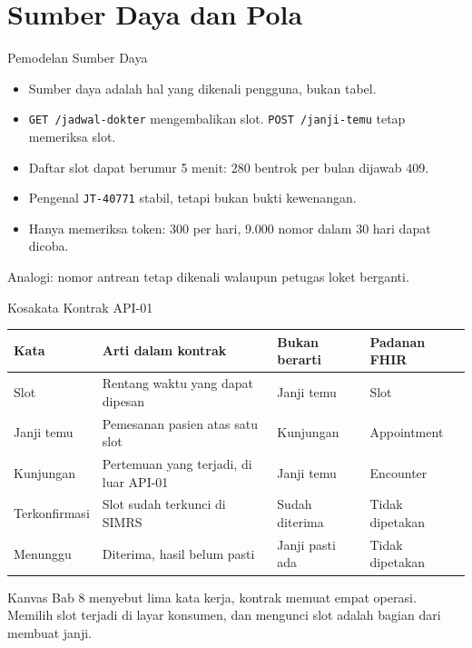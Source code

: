 \documentclass[aspectratio=169, table, 12pt]{beamer}
\begin{document}
\section{Sumber Daya dan Pola}

\begin{frame}{{\Large Pemodelan Sumber Daya}}
  \vspace{8pt}
  \begin{itemize}
    \item Sumber daya adalah hal yang dikenali pengguna, bukan tabel.
    \item \texttt{GET /jadwal-dokter} mengembalikan slot. \texttt{POST /janji-temu} tetap memeriksa slot.
    \item Daftar slot dapat berumur 5 menit: 280 bentrok per bulan dijawab 409.
    \item Pengenal \texttt{JT-40771} stabil, tetapi bukan bukti kewenangan.
    \item Hanya memeriksa token: 300 per hari, 9.000 nomor dalam 30 hari dapat dicoba.
  \end{itemize}
  \vspace{6pt}
  {\small Analogi: nomor antrean tetap dikenali walaupun petugas loket berganti.}
\end{frame}

\begin{frame}{{\Large Kosakata Kontrak API-01}}
  \footnotesize
  \begin{tabularx}{\textwidth}{>{\raggedright\arraybackslash}p{2.4cm} >{\raggedright\arraybackslash}X >{\raggedright\arraybackslash}p{3.1cm} >{\raggedright\arraybackslash}p{2.1cm}}
    \hline
    \textbf{Kata} & \textbf{Arti dalam kontrak} & \textbf{Bukan berarti} & \textbf{Padanan FHIR} \\ \hline
    Slot & Rentang waktu yang dapat dipesan & Janji temu & Slot \\ \hline
    Janji temu & Pemesanan pasien atas satu slot & Kunjungan & Appointment \\ \hline
    Kunjungan & Pertemuan yang terjadi, di luar API-01 & Janji temu & Encounter \\ \hline
    Terkonfirmasi & Slot sudah terkunci di SIMRS & Sudah diterima & Tidak dipetakan \\ \hline
    Menunggu & Diterima, hasil belum pasti & Janji pasti ada & Tidak dipetakan \\ \hline
  \end{tabularx}

  \vspace{8pt}
  \small Kanvas Bab 8 menyebut lima kata kerja, kontrak memuat empat operasi. Memilih slot terjadi di layar konsumen, dan mengunci slot adalah bagian dari membuat janji.
\end{frame}
\end{document}
